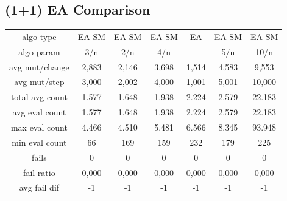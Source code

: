 \subsection{(1+1) EA Comparison}
\begin{tabular}[h]{ccccccc}
algo type&             EA-SM&      EA-SM&      EA-SM&         EA&      EA-SM&      EA-SM\\
algo param&              3/n&        2/n&        4/n&          -&        5/n&       10/n\\
avg mut/change&        2,883&      2,146&      3,698&      1,514&      4,583&      9,553\\
avg mut/step&          3,000&      2,002&      4,000&      1,001&      5,001&     10,000\\
\hline
total avg count&       1.577&      1.648&      1.938&      2.224&      2.579&     22.183\\
avg eval count&        1.577&      1.648&      1.938&      2.224&      2.579&     22.183\\
max eval count&        4.466&      4.510&      5.481&      6.566&      8.345&     93.948\\
min eval count&           66&        169&        159&        232&        179&        225\\
\hline
fails&                     0&          0&          0&          0&          0&          0\\
fail ratio&            0,000&      0,000&      0,000&      0,000&      0,000&      0,000\\
avg fail dif&             -1&         -1&         -1&         -1&         -1&         -1\\
\end{tabular}
